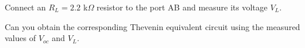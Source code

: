 \documentclass[11pt]{article}
\begin{document}
\begin{question}
    \begin{subquestion}{Connect an $R_L=2.2$ k$\Omega$ resistor to the port AB and measure its voltage $V_L$.}
    \end{subquestion}

    \begin{subquestion}{Can you obtain the corresponding Thevenin equivalent circuit using the measured values of $V_{oc}$ and $V_L$.}
    \end{subquestion}


\end{question}
\end{document}
